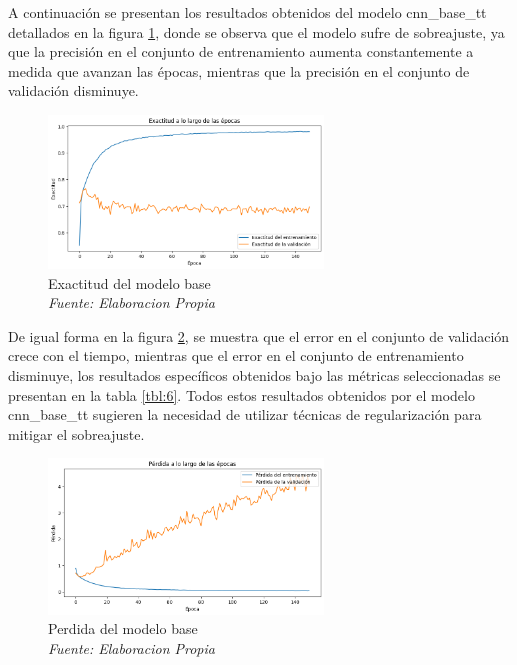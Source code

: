 A continuación se presentan los resultados obtenidos del modelo cnn\_base\_tt detallados en la figura \ref{fig:exactitud}, donde se observa que el modelo sufre de sobreajuste, ya que la precisión en el conjunto de entrenamiento aumenta constantemente a medida que avanzan las épocas, mientras que la precisión en el conjunto de validación disminuye.

\begin{figure}[h!]
	\includegraphics[width=0.65\textwidth]{capitulo5/figuras/exactitud.png}
	\caption[Exactitud del modelo base]{Exactitud del modelo base
		\\\textit{Fuente: Elaboracion Propia}}
	\label{fig:exactitud}
\end{figure}

 De igual forma en la figura \ref{fig:perdida}, se muestra que el error en el conjunto de validación crece con el tiempo, mientras que el error en el conjunto de entrenamiento disminuye, los resultados específicos obtenidos bajo las métricas seleccionadas se presentan en la tabla \ref{tbl:6}. Todos estos resultados obtenidos por el modelo cnn\_base\_tt  sugieren la necesidad de utilizar técnicas de regularización para mitigar el sobreajuste.



\begin{figure}[h!]
	\includegraphics[width=0.65\textwidth]{capitulo5/figuras/perdida.png}
	\caption[Perdida del modelo base]{Perdida del modelo base
		\\\textit{Fuente: Elaboracion Propia}}
	\label{fig:perdida}
\end{figure}

